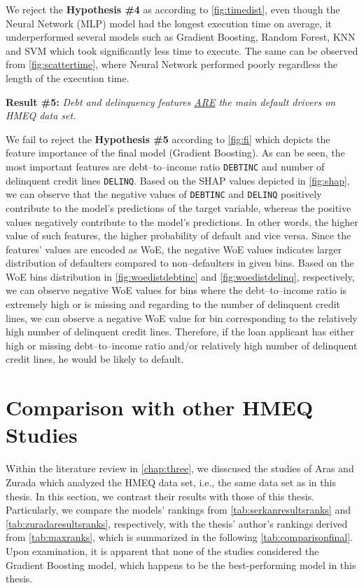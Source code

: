We reject the \textbf{Hypothesis \#4} as according to \autoref{fig:timedist}, even though the Neural Network (MLP) model had the longest execution time on average, it underperformed several models such as Gradient Boosting, Random Forest, KNN and SVM which took significantly less time to execute. The same can be observed from \autoref{fig:scattertime}, where Neural Network performed poorly regardless the length of the execution time.
\vspace{0.3cm}

\noindent \textbf{Result \#5:} \textit{Debt and delinquency features \underline{ARE} the main default drivers on HMEQ data set.}

We fail to reject the \textbf{Hypothesis \#5} according to \autoref{fig:fi} which depicts the feature importance of the final model (Gradient Boosting). As can be seen, the most important features are debt--to--income ratio \texttt{DEBTINC} and number of delinquent credit lines \texttt{DELINQ}.
Based on the SHAP values depicted in \autoref{fig:shap}, we can observe that the negative values of \texttt{DEBTINC} and \texttt{DELINQ} positively contribute to the model's predictions of the target variable, whereas the positive values negatively contribute to the model's predictions.
In other words, the higher value of such features, the higher probability of default and vice versa.
Since the features' values are encoded as WoE, the negative WoE values indicates larger distribution of defaulters compared to non--defaulters in given bins.
Based on the WoE bins distribution in \autoref{fig:woedistdebtinc} and \autoref{fig:woedistdelinq}, respectively, we can observe negative WoE values for bins where the debt--to--income ratio is extremely high or is missing and regarding to the number of delinquent credit lines, we can observe a negative WoE value for bin corresponding to the relatively high number of delinquent credit lines.
Therefore, if the loan applicant has either high or missing debt--to--income ratio and/or relatively high number of delinquent credit lines, he would be likely to default.

\newpage
\section{Comparison with other HMEQ Studies}
\label{sec:comparisonfinal}
Within the literature review in \autoref{chap:three}, we disscused the studies of Aras \citep{serkan2021bagging} and Zurada \citep{zurada2014classification} which analyzed the HMEQ data set, i.e., the same data set as in this thesis.
In this section, we contrast their results with those of this thesis. Particularly, we compare the models' rankings from \autoref{tab:serkanresultsranks} and \autoref{tab:zuradaresultsranks}, respectively, with the thesis' author's rankings derived from \autoref{tab:maxranks}, which is summarized in the following \autoref{tab:comparisonfinal}.
Upon examination, it is apparent that none of the studies considered the Gradient Boosting model, which happens to be the best-performing model in this thesis.

